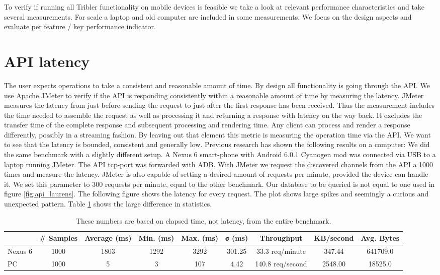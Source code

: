
To verify if running all Tribler functionality on mobile devices is feasible we take a look at relevant performance characteristics and take several measurements.
For scale a laptop and old computer are included in some measurements.
We focus on the design aspects and evaluate per feature / key performance indicator.


\section{API latency}
The user expects operations to take a consistent and reasonable amount of time.
By design all functionality is going through the API.
We use Apache JMeter to verify if the API is responding consistently within a reasonable amount of time by measuring the latency.
JMeter measures the latency from just before sending the request to just after the first response has been received. \cite{jmeter_glossary}
Thus the measurement includes the time needed to assemble the request as well as processing it and returning a response with latency on the way back.
It excludes the transfer time of the complete response and subsequent processing and rendering time.
Any client can process and render a response differently, possibly in a streaming fashion.
By leaving out that element this metric is measuring the operation time via the API.
We want to see that the latency is bounded, consistent and generally low.
Previous research has shown the following results on a computer:
We did the same benchmark with a slightly different setup.
A Nexus 6 smart-phone with Android 6.0.1 Cyanogen mod was connected via USB to a laptop running JMeter.
The API tcp-port was forwarded with ADB.
With JMeter we request the discovered channels from the API a 1000 times and measure the latency.
JMeter is also capable of setting a desired amount of requests per minute, provided the device can handle it.
We set this parameter to 300 requests per minute, equal to the other benchmark.
Our database to be queried is not equal to one used in figure \ref{fig:api_laurens}.
The following figure shows the latency for every request.
The plot shows large spikes and seemingly a curious and unexpected pattern.
Table \ref{table:api_benchmark} shows the large difference in statistics.
\begin{table}[h]
  \begin{tabular}{l | *{8}{c}}
  	 & # Samples & Average (ms) & Min. (ms) & Max. (ms) & σ (ms) & Throughput & KB/second & Avg. Bytes \\ \hline
	Nexus 6 & 1000 & 1803 & 1292 & 3292 & 301.25 & 33.3 req/minute & 347.44 & 641709.0 \\ \hline
	PC         & 1000 & 5        & 3      & 107   & 4.42     & 140.8 req/second & 2548.00 & 18525.0 \\ \hline
  \end{tabular}
  \caption[Total response time statistics]{These numbers are based on elapsed time, not latency, from the entire benchmark.}
  \label{table:api_benchmark}
\end{table}
